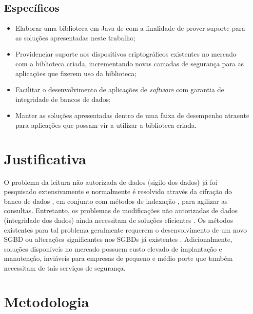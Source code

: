 \subsection{Específicos}
\begin{itemize}
  \item Elaborar uma biblioteca em Java de com a finalidade de prover suporte para as soluções apresentadas neste trabalho;
  \item Providenciar suporte aos dispositivos criptográficos existentes no mercado com a biblioteca criada, incrementando novas camadas de 
  segurança para as aplicações que fizerem uso da biblioteca;
  \item Facilitar o desenvolvimento de aplicações de \textit{software} com garantia de integridade de bancos de dados;
  \item Manter as soluções apresentadas dentro de uma faixa de desempenho atraente para aplicações que possam vir a utilizar a biblioteca criada.
\end{itemize}

\section{Justificativa}
O problema da leitura não autorizada de dados (sigilo dos dados) já foi pesquisado extensivamente e normalmente é resolvido através da
cifração do banco de dados \cite{samarati.encryption.2006, Samarati:2010}, em conjunto com métodos de indexação
\cite{samarati.encryption.2006, samarati.indexing.2003}, para agilizar as consultas.
Entretanto, os problemas de modificações não autorizadas de dados (integridade dos dados) ainda necessitam de soluções eficientes
\cite{Samarati:2010}.
Os métodos existentes para tal problema geralmente requerem o desenvolvimento de um novo \ac{SGBD} ou
alterações significantes nos \ac{SGBD}s já existentes \cite{Xie.integrity.2007}. Adicionalmente, soluções disponíveis no mercado possuem 
custo elevado de implantação e manutenção, inviáveis para empresas de pequeno e médio porte que também necessitam de tais serviços de segurança.

\section{Metodologia}

